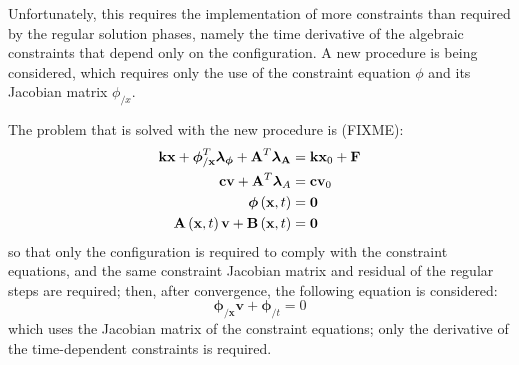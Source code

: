 \documentclass[10pt,dvips,fleqn,subeqn]{report}
\newcommand{\T}[1]{\bm{\mathbf{#1}}}
\begin{document}
Unfortunately, this requires the implementation of more constraints
than required by the regular solution phases, namely the time derivative
of the algebraic constraints that depend only on the configuration.
A new procedure is being considered, which requires only the use 
of the constraint equation $\phi$ and its Jacobian matrix $\phi_{/x}$.

The problem that is solved with the new procedure is (FIXME):
\begin{align}
	\T{k} \T{x} + \T{\phi}_{/\T{x}}^T \T{\lambda}_{\T{\phi}} + \T{A}^T \T{\lambda}_{\T{A}} 
		& = \T{k} \T{x}_0 + \T{F} \\
	\T{c} \T{v} + \T{A}^T \T{\lambda}_{A} & = \T{c} \T{v}_0 \\
	\T{\phi}\plbr{\T{x}, t} & = \T{0} \\
	\T{A}\plbr{\T{x}, t} \T{v} + \T{B}\plbr{\T{x}, t} & = \T{0}
\end{align}
so that only the configuration is required to comply 
with the constraint equations, and the same constraint 
Jacobian matrix and residual of the regular steps are required;
then, after convergence, the following equation is considered:
\begin{equation}
	\T{\phi}_{/\T{x}} \T{v} + \T{\phi}_{/t} = 0
\end{equation}
which uses the Jacobian matrix of the constraint equations; 
only the derivative of the time-dependent constraints is required.
\end{document}
